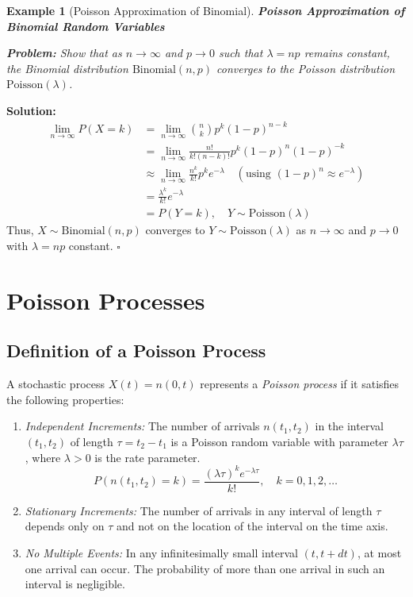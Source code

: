 \documentclass[12pt]{article}
\newtheorem{example}{Example}
\newenvironment{solution}{\noindent\textbf{Solution:}}{\hfill$\square$}
\begin{document}
\begin{example}[Poisson Approximation of Binomial]
    \textbf{Poisson Approximation of Binomial Random Variables}
    
    \textbf{Problem:} Show that as \( n \to \infty \) and \( p \to 0 \) such that \( \lambda = n p \) remains constant, the Binomial distribution \( \text{Binomial}(n, p) \) converges to the Poisson distribution \( \text{Poisson}(\lambda) \).
\end{example}
\begin{solution}
\begin{align*}
    \lim_{n \to \infty} P(X = k) &= \lim_{n \to \infty} \binom{n}{k} p^k (1 - p)^{n - k} \\
    &= \lim_{n \to \infty} \frac{n!}{k! (n - k)!} p^k (1 - p)^{n} (1 - p)^{-k} \\
    &\approx \lim_{n \to \infty} \frac{n^k}{k!} p^k e^{-\lambda} \quad (\text{using } (1 - p)^n \approx e^{-\lambda}) \\
    &= \frac{\lambda^k}{k!} e^{-\lambda} \\
    &= P(Y = k), \quad Y \sim \text{Poisson}(\lambda)
\end{align*}
Thus, \( X \sim \text{Binomial}(n, p) \) converges to \( Y \sim \text{Poisson}(\lambda) \) as \( n \to \infty \) and \( p \to 0 \) with \( \lambda = n p \) constant.
\end{solution}

\section{Poisson Processes}

\subsection{Definition of a Poisson Process}
A stochastic process \( X(t) = n(0, t) \) represents a \textit{Poisson process} if it satisfies the following properties:

\begin{enumerate}
    \item \textit{Independent Increments:} The number of arrivals \( n(t_1, t_2) \) in the interval \( (t_1, t_2) \) of length \( \tau = t_2 - t_1 \) is a Poisson random variable with parameter \( \lambda \tau \), where \( \lambda > 0 \) is the rate parameter.
    \[
    P(n(t_1, t_2) = k) = \frac{(\lambda \tau)^k e^{-\lambda \tau}}{k!}, \quad k = 0, 1, 2, \ldots
    \]
    
    \item \textit{Stationary Increments:} The number of arrivals in any interval of length \( \tau \) depends only on \( \tau \) and not on the location of the interval on the time axis.
    
    \item \textit{No Multiple Events:} In any infinitesimally small interval \( (t, t + dt) \), at most one arrival can occur. The probability of more than one arrival in such an interval is negligible.
\end{enumerate}
\end{document}

